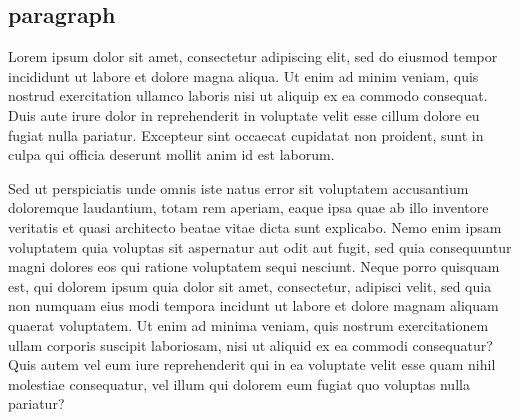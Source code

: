 \documentclass[11pt,a4paper]{ltjsarticle}
\begin{document}
\subsection*{paragraph}

Lorem ipsum dolor sit amet, consectetur adipiscing elit, sed do eiusmod tempor incididunt ut labore et dolore magna aliqua. Ut enim ad minim veniam, quis nostrud exercitation ullamco laboris nisi ut aliquip ex ea commodo consequat. Duis aute irure dolor in reprehenderit in voluptate velit esse cillum dolore eu fugiat nulla pariatur. Excepteur sint occaecat cupidatat non proident, sunt in culpa qui officia deserunt mollit anim id est laborum.

Sed ut perspiciatis unde omnis iste natus error sit voluptatem accusantium doloremque laudantium, totam rem aperiam, eaque ipsa quae ab illo inventore veritatis et quasi architecto beatae vitae dicta sunt explicabo. Nemo enim ipsam voluptatem quia voluptas sit aspernatur aut odit aut fugit, sed quia consequuntur magni dolores eos qui ratione voluptatem sequi nesciunt. Neque porro quisquam est, qui dolorem ipsum quia dolor sit amet, consectetur, adipisci velit, sed quia non numquam eius modi tempora incidunt ut labore et dolore magnam aliquam quaerat voluptatem. Ut enim ad minima veniam, quis nostrum exercitationem ullam corporis suscipit laboriosam, nisi ut aliquid ex ea commodi consequatur? Quis autem vel eum iure reprehenderit qui in ea voluptate velit esse quam nihil molestiae consequatur, vel illum qui dolorem eum fugiat quo voluptas nulla pariatur?
\end{document}
